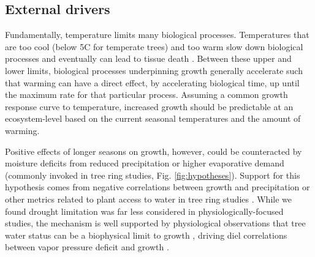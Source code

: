 \documentclass[11pt]{article}
\begin{document}
\subsection*{External drivers}

Fundamentally, temperature limits many biological processes. Temperatures that are too cool (below 5\degree C for temperate trees) and too warm \citep[an area of active research, but likely between 35-45\degree C;][]{martinez2008hot,cabon2022cross} slow down biological processes and eventually can lead to tissue death \citep[see Fig. \ref{fig:temperaturecomplex},][]{larcher1980,kramer2012book}. Between these upper and lower limits, biological processes underpinning growth generally accelerate such that warming can have a direct effect, by accelerating biological time, up until the maximum rate for that particular process. Assuming a common growth response curve to temperature, increased growth should be predictable at an ecosystem-level based on the current seasonal temperatures and the amount of warming. 

Positive effects of longer seasons on growth, however, could be counteracted by moisture deficits from reduced precipitation or higher evaporative demand (commonly invoked in tree ring studies, Fig. \ref{fig:hypotheses}). Support for this hypothesis comes from negative correlations between growth and precipitation or other metrics related to plant access to water in tree ring studies \citep{kolavr2016response,etzold2022number}. While we found drought limitation was far less considered in physiologically-focused studies, the mechanism is well supported by physiological observations that tree water status can be a biophysical limit to growth \citep[i.e., cells cannot expand without sufficient turgor,][]{peters2021turgor,cosgrove2023structure}, driving diel correlations between vapor pressure deficit and growth \citep{babst2019twentieth,zweifel2021trees}.
\end{document}
